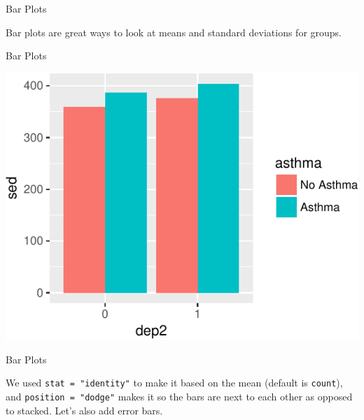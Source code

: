 \begin{frame}[fragile]{Bar Plots}

Bar plots are great ways to look at means and standard deviations for
groups.

\begin{Shaded}
\begin{Highlighting}[]
\NormalTok{(}
                        \OperatorTok{+}
\StringTok{  }\NormalTok{(}\NormalTok{(}
            \NormalTok{, }
            \NormalTok{)}
\end{Highlighting}
\end{Shaded}

\end{frame}

\begin{frame}{Bar Plots}

\includegraphics{09_AdvancedPlotting_files/figure-beamer/c6-1.pdf}

\end{frame}

\begin{frame}[fragile]{Bar Plots}

We used \texttt{stat\ =\ "identity"} to make it based on the mean
(default is \texttt{count}), and \texttt{position\ =\ "dodge"} makes it
so the bars are next to each other as opposed to stacked. Let's also add
error bars.

\end{frame}

